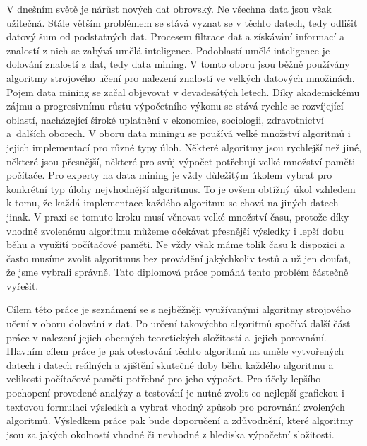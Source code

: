 \documentclass[12pt]{article}
\begin{document}
V dnešním světě je nárůst nových dat obrovský. Ne všechna data jsou však užitečná. Stále větším problémem se stává vyznat se v těchto datech, tedy odlišit datový šum od podstatných dat. Procesem filtrace dat a získávání informací a znalostí z nich se zabývá umělá inteligence. Podoblastí umělé inteligence je dolování znalostí z dat, tedy data mining. V tomto oboru jsou běžně používány algoritmy strojového učení pro nalezení znalostí ve velkých datových množinách. Pojem data mining se začal objevovat v devadesátých letech.  Díky akademickému zájmu a progresivnímu růstu výpočetního výkonu se  stává rychle se rozvíjející oblastí, nacházející široké uplatnění v ekonomice, sociologii, zdravotnictví a~dalších oborech. 
\newline
\indent
V oboru data miningu se používá velké množství algoritmů i jejich implementací pro různé typy úloh. Některé algoritmy jsou rychlejší než jiné, některé jsou přesnější, některé pro svůj výpočet potřebují velké množství paměti počítače. Pro experty na data mining je vždy důležitým úkolem vybrat pro konkrétní typ úlohy nejvhodnější algoritmus. To je ovšem obtížný úkol vzhledem k tomu, že každá implementace každého algoritmu se chová na jiných datech jinak. V praxi se tomuto kroku musí věnovat velké množství času, protože díky vhodně zvolenému algoritmu můžeme očekávat přesnější výsledky i lepší dobu běhu a využití počítačové paměti. Ne vždy však máme tolik času k dispozici a často musíme zvolit algoritmus bez provádění jakýchkoliv testů a už jen doufat, že jsme vybrali správně. Tato diplomová práce pomáhá tento problém částečně vyřešit.

Cílem této práce je seznámení se s nejběžněji využívanými algoritmy strojového učení v oboru dolování z dat. Po určení takovýchto algoritmů spočívá další část práce v nalezení jejich obecných teoretických složitostí a~jejich porovnání. Hlavním cílem práce je pak otestování těchto algoritmů na uměle vytvořených datech i datech reálných a zjištění skutečné doby běhu každého algoritmu a velikosti počítačové paměti potřebné pro jeho výpočet. Pro účely lepšího pochopení provedené analýzy a testování je nutné zvolit co nejlepší grafickou i textovou formulaci výsledků a vybrat vhodný způsob pro porovnání zvolených algoritmů. Výsledkem práce pak bude doporučení a zdůvodnění, které algoritmy jsou za jakých okolností vhodné či nevhodné z hlediska výpočetní složitosti.
\end{document}
